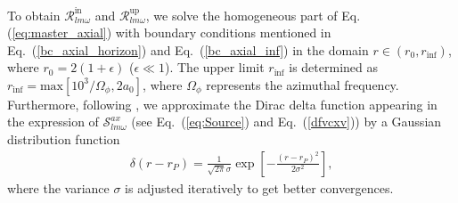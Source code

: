 \documentclass[11pt]{article}
\def\In{\textrm{in}}
\def\up{\textrm{up}}
\newcommand{\ca}[1]{\mathcal{#1}}
\begin{document}
To obtain $\ca{R}_{lm\omega}^{\In}$ and $\ca{R}_{lm\omega}^{\up}$, we solve the homogeneous part of Eq. (\ref{eq:master_axial}) with boundary conditions mentioned in Eq.~(\ref{bc_axial_horizon}) and Eq.~(\ref{bc_axial_inf}) in the domain $r\in (r_0,r_{\textrm{inf}})$, where $r_0=2(1+\epsilon)$ ($\epsilon\ll 1$). The upper limit $r_{\textrm{inf}}$ is determined as $r_{\textrm{inf}}=\textrm{max}[10^3/\Omega_\phi,2a_0]$, where $\Omega_\phi$ represents the azimuthal frequency. Furthermore, following \cite{Cardoso:2022whc}, we approximate the Dirac delta function appearing in the expression of $\ca{S}_{lm\omega}^{ax}$ (see Eq.~(\ref{eq:Source}) and Eq.~(\ref{dfvcxv})) by a Gaussian distribution function 
\begin{equation}\label{dirac_delta}
\begin{aligned}
\delta(r-r_P)=\frac{1}{\sqrt{2\pi}\sigma}\exp{\left[-\frac{(r-r_P)^2}{2\sigma^2}\right]},
\end{aligned}
\end{equation}
where the variance $\sigma$ is adjusted iteratively to get better convergences.\par
  
\end{document}
